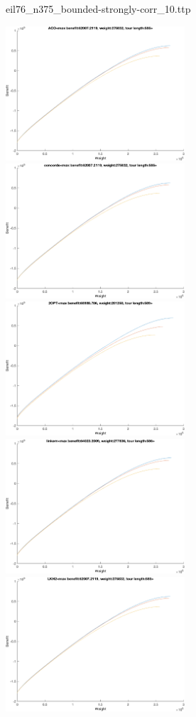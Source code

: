 \documentclass{article}
\begin{document}
\newpage
eil76\_n375\_bounded-strongly-corr\_10.ttp

\noindent
\includegraphics[width=0.5\textwidth]{eil76figs/eil76_n375_bounded-strongly-corr_10.ttp.aco.txt.atsf.eps}
\includegraphics[width=0.5\textwidth]{eil76figs/eil76_n375_bounded-strongly-corr_10.ttp.con.txt.atsf.eps}
\includegraphics[width=0.5\textwidth]{eil76figs/eil76_n375_bounded-strongly-corr_10.ttp.inv.txt.atsf.eps}
\includegraphics[width=0.5\textwidth]{eil76figs/eil76_n375_bounded-strongly-corr_10.ttp.lkh.txt.atsf.eps}
\includegraphics[width=0.5\textwidth]{eil76figs/eil76_n375_bounded-strongly-corr_10.ttp.lkh2.txt.atsf.eps}
\end{document}

